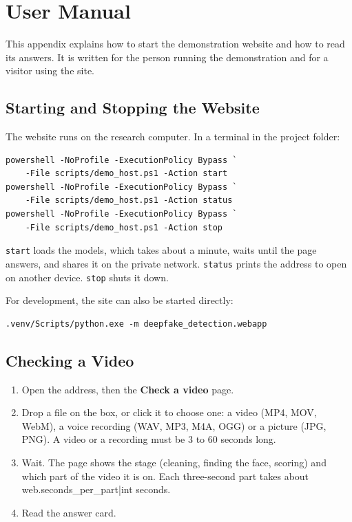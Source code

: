 %
\chapter{User Manual}
\label{app:manual}

This appendix explains how to start the demonstration website and how to read
its answers. It is written for the person running the demonstration and for a
visitor using the site.

\section{Starting and Stopping the Website}

The website runs on the research computer. In a terminal in the project
folder:

\begin{verbatim}
powershell -NoProfile -ExecutionPolicy Bypass `
    -File scripts/demo_host.ps1 -Action start
powershell -NoProfile -ExecutionPolicy Bypass `
    -File scripts/demo_host.ps1 -Action status
powershell -NoProfile -ExecutionPolicy Bypass `
    -File scripts/demo_host.ps1 -Action stop
\end{verbatim}

\texttt{start} loads the models, which takes about a minute, waits until the
page answers, and shares it on the private network. \texttt{status} prints the
address to open on another device. \texttt{stop} shuts it down.

For development, the site can also be started directly:

\begin{verbatim}
.venv/Scripts/python.exe -m deepfake_detection.webapp
\end{verbatim}

\section{Checking a Video}

\begin{enumerate}
    \item Open the address, then the \textbf{Check a video} page.
    \item Drop a file on the box, or click it to choose one: a video (MP4,
    MOV, WebM), a voice recording (WAV, MP3, M4A, OGG) or a picture (JPG,
    PNG). A video or a recording must be 3 to 60 seconds long.
    \item Wait. The page shows the stage (cleaning, finding the face, scoring)
    and which part of the video it is on. Each three-second part takes about
    {{web.seconds_per_part|int}} seconds.
    \item Read the answer card.
\end{enumerate}

